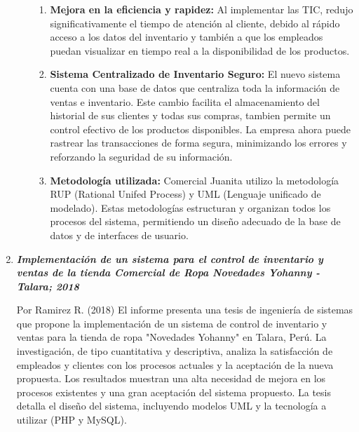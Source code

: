 \documentclass{article}
\begin{document}
\begin{enumerate}
\begin{itemize}
\begin{enumerate}
      \item \textbf{Mejora en la eficiencia y rapidez:} Al implementar las TIC, redujo significativamente el tiempo de atención al cliente, debido al rápido acceso a los datos del inventario y también a que los empleados puedan visualizar en tiempo real a la disponibilidad de los productos. 
      \item \textbf{Sistema Centralizado de Inventario Seguro:} El nuevo sistema cuenta con una base de datos que centraliza toda la información de ventas e inventario. Este cambio facilita el almacenamiento del historial de sus clientes y todas sus compras, tambien permite un control efectivo de los productos disponibles. La empresa ahora puede rastrear las transacciones de forma segura, minimizando los errores y reforzando la seguridad de su información.  
      \item \textbf{Metodología utilizada:} Comercial Juanita utilizo la metodología RUP (Rational Unifed Process) y UML (Lenguaje unificado de modelado). Estas metodologías estructuran y organizan todos los procesos del sistema, permitiendo un diseño adecuado de la base de datos y de interfaces de usuario. 
    \end{enumerate} 
  \end{itemize}
  \newpage
  \item \textbf{\textit{Implementación de un sistema para el control de inventario y ventas de la tienda Comercial de Ropa Novedades Yohanny - Talara; 2018}}
  
  Por Ramirez R. (2018) El informe presenta una tesis de ingeniería de sistemas que propone la implementación de un sistema de control de inventario y ventas para la tienda de ropa "Novedades Yohanny" en Talara, Perú. La investigación, de tipo cuantitativa y descriptiva, analiza la satisfacción de empleados y clientes con los procesos actuales y la aceptación de la nueva propuesta. Los resultados muestran una alta necesidad de mejora en los procesos existentes y una gran aceptación del sistema propuesto. La tesis detalla el diseño del sistema, incluyendo modelos UML y la tecnología a utilizar (PHP y MySQL).


\end{enumerate}
\end{document}
